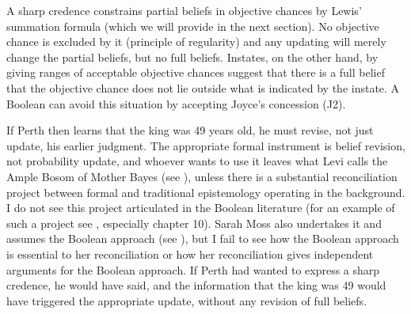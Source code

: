 \documentclass[11pt]{article}
\begin{document}
A sharp credence constrains partial beliefs in objective chances by Lewis' summation formula (which we will provide in the next section). No objective chance is excluded by it (principle of regularity) and any updating will merely change the partial beliefs, but no full beliefs. Instates, on the other hand, by giving ranges of acceptable objective chances suggest that there is a full belief that the objective chance does not lie outside what is indicated by the instate. A Boolean can avoid this situation by accepting Joyce's concession (J2). 


If Perth then learns that the king was 49 years old, he must revise, not just update, his earlier judgment. The appropriate formal instrument is belief revision, not probability update, and whoever wants to use it leaves what Levi calls the Ample Bosom of Mother Bayes (see ), unless there is a substantial reconciliation project between formal and traditional epistemology operating in the background. I do not see this project articulated in the Boolean literature (for an example of such a project see , especially chapter 10). Sarah Moss also undertakes it and assumes the Boolean approach (see ), but I fail to see how the Boolean approach is essential to her reconciliation or how her reconciliation gives independent arguments for the Boolean approach. If Perth had wanted to express a sharp credence, he would have said,  and the information that the king was 49 would have triggered the appropriate update, without any revision of full beliefs.
\end{document}

